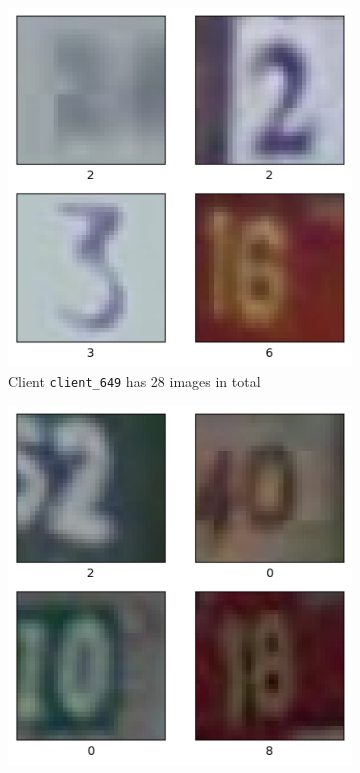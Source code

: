 \begin{figure}[tb]
    \centering
    \begin{subfigure}{0.4\textwidth}
		\centering        
        \includegraphics[width=\linewidth]{Bilder/svhn_client1.png}
        \caption{Client \texttt{client\_649} has 28 images in total}
    \end{subfigure}
    \hfill
    \begin{subfigure}{0.4\textwidth}
    		\centering        
        \includegraphics[width=\linewidth]{Bilder/svhn_client2.png}

\end{subfigure}
\end{figure}
